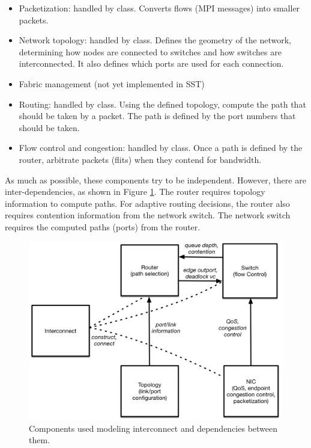\begin{itemize}
\item Packetization: handled by  class. Converts flows (MPI messages) into smaller packets.
\item Network topology: handled by  class. Defines the geometry of the network, determining how nodes are connected to switches and how switches are interconnected. It also defines which ports are used for each connection.
\item Fabric management (not yet implemented in SST)
\item Routing: handled by  class. Using the defined topology, compute the path that should be taken by a packet. The path is defined by the port numbers that should be taken.
\item Flow control and congestion: handled by  class. Once a path is defined by the router, arbitrate packets (flits) when they contend for bandwidth.
\end{itemize}
As much as possible, these components try to be independent. However, there are inter-dependencies, as shown in Figure \ref{fig:dependencies}.
The router requires topology information to compute paths. For adaptive routing decisions, the router also requires contention information from the network switch.
The network switch requires the computed paths (ports) from the router.

\begin{figure}
\centering
\includegraphics[width=1.0\textwidth]{figures/components.png}
\caption{Components used modeling interconnect and dependencies between them.}
\label{fig:dependencies}
\end{figure}

